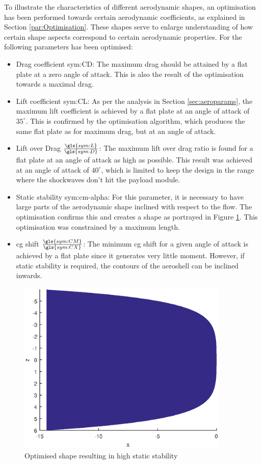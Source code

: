 To illustrate the characteristics of different aerodynamic shapes, an optimisation has been performed towards certain aerodynamic coefficients, as explained in Section \ref{par:Optimisation}. These shapes serve to enlarge understanding of how certain shape aspects correspond to certain aerodynamic properties. For the following parameters has been optimised:
\begin{itemize}
	\item Drag coefficient \gls{sym:CD}: The maximum drag should be attained by a flat plate at a zero angle of attack. This is also the result of the optimisation towards a maximal drag.
	\item Lift coefficient \gls{sym:CL}: As per the analysis in Section \ref{sec:aeroparams}, the maximum lift coefficient is achieved by a flat plate at an angle of attack of $35^\circ$. This is confirmed by the optimisation algorithm, which produces the same flat plate as for maximum drag, but at an angle of attack.
	\item Lift over Drag $\frac{\gls{sym:L}}{\gls{sym:D}}$: The maximum lift over drag ratio is found for a flat plate at an angle of attack as high as possible. This result was achieved at an angle of attack of $40^\circ$, which is limited to keep the design in the range where the shockwaves don't hit the payload module.
	\item Static stability \gls{sym:cm-alpha}: For this parameter, it is necessary to have large parts of the aerodynamic shape inclined with respect to the flow. The optimisation confirms this and creates a shape as portrayed in Figure \ref{fig:highcmalphashape}. This optimisation was constrained by a maximum length.
	\item \gls{cg} shift $\frac{\gls{sym:CM}}{\gls{sym:CX}}$: The minimum \gls{cg} shift for a given angle of attack is achieved by a flat plate since it generates very little moment. However, if static stability is required, the contours of the aeroshell can be inclined inwards.
\end{itemize}


\begin{figure}[h]
	\includegraphics[width=0.9\textwidth]{./Figure/Aerodynamics/cmalphamax.eps}
	\caption{Optimised shape resulting in high static stability}
	\label{fig:highcmalphashape}
\end{figure}
	

